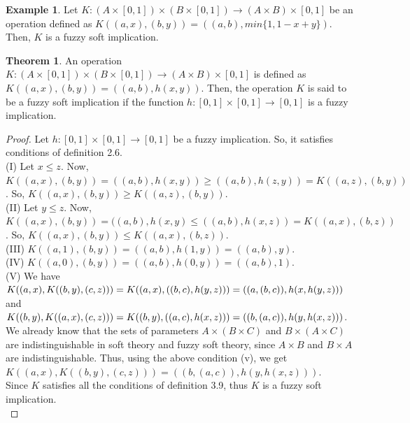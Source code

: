 \documentclass{article}
\theoremstyle{definition}
\newtheorem{theorem}{Theorem}[section]
\newtheorem{example}{Example}[section]
\begin{document}
\begin{example}
    Let $K:(A\times[0, 1])\times (B\times[0, 1]) \to (A\times B)\times[0, 1]$ be an operation defined as $K((a, x), (b, y))=((a, b), min\{1, 1-x+y\})$. Then, $K$ is a fuzzy soft implication.
\end{example}

\begin{theorem}
    An operation $K:(A\times[0, 1])\times (B\times[0, 1]) \to (A\times B)\times[0, 1]$ is defined as $K((a, x), (b, y))= ((a, b), h(x, y))$. Then, the operation $K$ is said to be a fuzzy soft implication if the function $h:[0,1]\times [0, 1] \to [0, 1]$ is a fuzzy implication.
\end{theorem}
\begin{proof}
    Let $h:[0,1]\times [0, 1] \to [0, 1]$ be a fuzzy implication. So, it satisfies conditions of definition 2.6.\\

(I) Let $x\leq z$. Now, $K((a, x), (b, y)) = ((a, b), h(x, y)) \geq ((a, b), h(z, y)) = K((a, z), (b, y))$. So, $K((a, x), (b, y))\geq K((a, z), (b, y))$.\\

(II) Let $y\leq z$. Now, $K((a, x), (b, y)) = ((a, b), h(x, y) \leq ((a, b), h(x, z)) = K((a, x), (b, z))$. So, $K((a, x), (b, y))\leq K((a, x), (b, z))$.\\

(III) $K((a, 1), (b, y)) = ((a, b), h(1, y)) = ((a, b), y)$.\\

(IV) $K((a, 0), (b, y) ) = ((a, b), h(0, y)) = ((a, b), 1)$.\\

(V) We have $K((a, x), K((b, y), (c, z)))=K((a, x), ((b, c), h(y, z)))=((a, (b, c)), \\h(x, h(y, z)))$ and $K((b, y), K((a, x), (c, z)))=K((b, y), ((a, c), h(x, z)))=((b, (a, c)),\\ h(y, h(x, z)))$. We already know that the sets of parameters $A\times (B\times C)$ and $B\times (A\times C)$ are indistinguishable in soft theory and fuzzy soft theory, since $A\times B$ and $B\times A$ are indistinguishable. Thus, using the above condition (v), we get $K((a, x), K((b, y), (c, z)))=((b, (a, c)), h(y, h(x, z)))$.\\

Since $K$ satisfies all the conditions of definition 3.9, thus $K$ is a fuzzy soft implication.\\
    
\end{proof}
\end{document}
